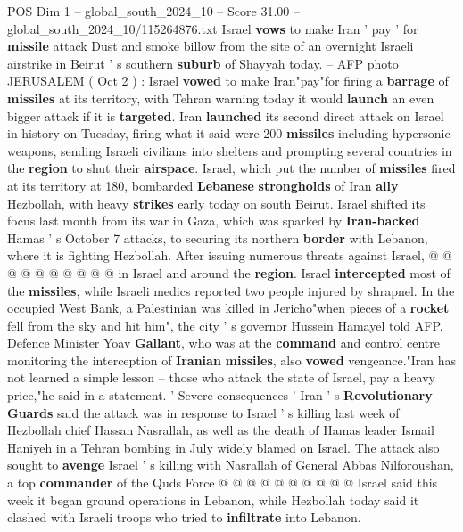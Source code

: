 \begin{textsample}{POS Dim 1 – global\_south\_2024\_10 – Score 31.00 – global\_south\_2024\_10/115264876.txt}  \label{ex:f1_pos_027}
Israel \textbf{vows} to make Iran ' pay ' for \textbf{missile} attack Dust and smoke billow from the site of an overnight Israeli airstrike in Beirut ' s southern \textbf{suburb} of Shayyah today. -- AFP photo JERUSALEM ( Oct 2 ) : Israel \textbf{vowed} to make Iran"pay"for firing a \textbf{barrage} of \textbf{missiles} at its territory, with Tehran warning today it would \textbf{launch} an even bigger attack if it is \textbf{targeted}.
Iran \textbf{launched} its second direct attack on Israel in history on Tuesday, firing what it said were 200 \textbf{missiles} including hypersonic weapons, sending Israeli civilians into shelters and prompting several countries in the \textbf{region} to shut their \textbf{airspace}.
Israel, which put the number of \textbf{missiles} fired at its territory at 180, bombarded \textbf{Lebanese} \textbf{strongholds} of Iran \textbf{ally} Hezbollah, with heavy \textbf{strikes} early today on south Beirut.
Israel shifted its focus last month from its war in Gaza, which was sparked by \textbf{Iran-backed} Hamas ' s October 7 attacks, to securing its northern \textbf{border} with Lebanon, where it is fighting Hezbollah.
After issuing numerous threats against Israel, @ @ @ @ @ @ @ @ @ @ in Israel and around the \textbf{region}.
Israel \textbf{intercepted} most of the \textbf{missiles}, while Israeli medics reported two people injured by shrapnel.
In the occupied West Bank, a Palestinian was killed in Jericho"when pieces of a \textbf{rocket} fell from the sky and hit him", the city ' s governor Hussein Hamayel told AFP.
Defence Minister Yoav \textbf{Gallant}, who was at the \textbf{command} and control centre monitoring the interception of \textbf{Iranian} \textbf{missiles}, also \textbf{vowed} vengeance."Iran has not learned a simple lesson -- those who attack the state of Israel, pay a heavy price,"he said in a statement. ' Severe consequences ' Iran ' s \textbf{Revolutionary} \textbf{Guards} said the attack was in response to Israel ' s killing last week of Hezbollah chief Hassan Nasrallah, as well as the death of Hamas leader Ismail Haniyeh in a Tehran bombing in July widely blamed on Israel.
The attack also sought to \textbf{avenge} Israel ' s killing with Nasrallah of General Abbas Nilforoushan, a top \textbf{commander} of the Quds Force @ @ @ @ @ @ @ @ @ @ Israel said this week it began ground operations in Lebanon, while Hezbollah today said it clashed with Israeli troops who tried to \textbf{infiltrate} into Lebanon.

\end{textsample}
